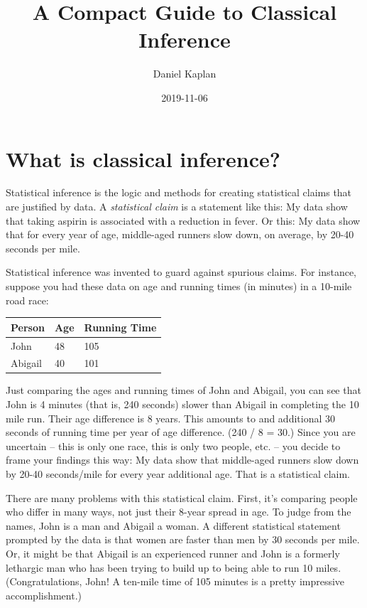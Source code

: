 \documentclass[]{book}
\title{A Compact Guide to Classical Inference}
\author{Daniel Kaplan}
\date{2019-11-06}
\begin{document}
\maketitle

{
\setcounter{tocdepth}{1}
\tableofcontents
}
\hypertarget{what-is-classical-inference}{%
\chapter{What is classical inference?}\label{what-is-classical-inference}}

Statistical inference is the logic and methods for creating statistical claims that are justified by data. A \emph{statistical claim} is a statement like this: My data show that taking aspirin is associated with a reduction in fever. Or this: My data show that for every year of age, middle-aged runners slow down, on average, by 20-40 seconds per mile.

Statistical inference was invented to guard against spurious claims. For instance, suppose you had these data on age and running times (in minutes) in a 10-mile road race:

\begin{longtable}[]{@{}lll@{}}
\toprule
Person & Age & Running Time\tabularnewline
\midrule
\endhead
John & 48 & 105\tabularnewline
Abigail & 40 & 101\tabularnewline
\bottomrule
\end{longtable}

Just comparing the ages and running times of John and Abigail, you can see that John is 4 minutes (that is, 240 seconds) slower than Abigail in completing the 10 mile run. Their age difference is 8 years. This amounts to and additional 30 seconds of running time per year of age difference. (240 / 8 = 30.) Since you are uncertain -- this is only one race, this is only two people, etc. -- you decide to frame your findings this way: My data show that middle-aged runners slow down by 20-40 seconds/mile for every year additional age. That is a statistical claim.

There are many problems with this statistical claim. First, it's comparing people who differ in many ways, not just their 8-year spread in age. To judge from the names, John is a man and Abigail a woman. A different statistical statement prompted by the data is that women are faster than men by 30 seconds per mile. Or, it might be that Abigail is an experienced runner and John is a formerly lethargic man who has been trying to build up to being able to run 10 miles. (Congratulations, John! A ten-mile time of 105 minutes is a pretty impressive accomplishment.)
\end{document}
